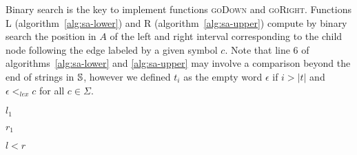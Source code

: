 Binary search is the key to implement functions \textsc{goDown} and \textsc{goRight}.
Functions \textsc{L} (algorithm~\ref{alg:sa-lower}) and \textsc{R} (algorithm~\ref{alg:sa-upper}) compute by binary search the position in $A$ of the left and right interval corresponding to the child node following the edge labeled by a given symbol $c$.
Note that line 6 of algorithms~\ref{alg:sa-lower} and \ref{alg:sa-upper} may involve a comparison beyond the end of strings in $\mathbb {S}$, however we defined $t_i$ as the empty word $\epsilon$ if $i > |t|$ and $\epsilon <_{lex} c$ for all $c \in \Sigma$.

\begin{algorithm}[h!]
\begin{minipage}[t]{.5\textwidth}
\label{alg:sa-lower}
\begin{algorithmic}[1]
		\Else
		\EndIf
	\EndWhile
	\State \Return $l_1$
\EndProcedure
\end{algorithmic}
\end{minipage}
\hfill
\begin{minipage}[t]{.5\textwidth}
\label{alg:sa-upper}
\begin{algorithmic}[1]
		\Else
		\EndIf
	\EndWhile
	\State \Return $r_1$
\EndProcedure
\end{algorithmic}
\end{minipage}
\end{algorithm}

\begin{algorithm}[h!]
\begin{minipage}[t]{.5\textwidth}
\begin{algorithmic}[1]
\EndProcedure
\end{algorithmic}
\end{minipage}
\begin{minipage}[t]{.5\textwidth}
\begin{algorithmic}[1]
		\State \Return \False
	\EndIf
	\State \Return $l < r$
\EndProcedure
\end{algorithmic}
\end{minipage}
\end{algorithm}

